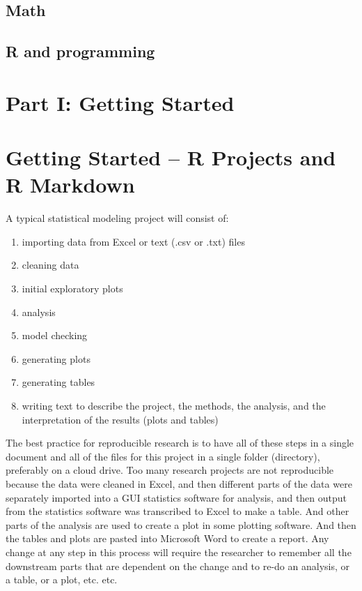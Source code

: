 \documentclass[]{book}
\providecommand{\tightlist}{%
  \setlength{\itemsep}{0pt}\setlength{\parskip}{0pt}}
\begin{document}
\hypertarget{math}{%
\section{Math}\label{math}}

\hypertarget{r-and-programming}{%
\section{R and programming}\label{r-and-programming}}

\hypertarget{part-i-getting-started}{%
\chapter*{Part I: Getting Started}\label{part-i-getting-started}}

\hypertarget{getting-started-r-projects-and-r-markdown}{%
\chapter{Getting Started -- R Projects and R Markdown}\label{getting-started-r-projects-and-r-markdown}}

A typical statistical modeling project will consist of:

\begin{enumerate}
\def\labelenumi{\arabic{enumi}.}
\tightlist
\item
  importing data from Excel or text (.csv or .txt) files
\item
  cleaning data
\item
  initial exploratory plots
\item
  analysis
\item
  model checking
\item
  generating plots
\item
  generating tables
\item
  writing text to describe the project, the methods, the analysis, and the interpretation of the results (plots and tables)
\end{enumerate}

The best practice for reproducible research is to have all of these steps in a single document and all of the files for this project in a single folder (directory), preferably on a cloud drive. Too many research projects are not reproducible because the data were cleaned in Excel, and then different parts of the data were separately imported into a GUI statistics software for analysis, and then output from the statistics software was transcribed to Excel to make a table. And other parts of the analysis are used to create a plot in some plotting software. And then the tables and plots are pasted into Microsoft Word to create a report. Any change at any step in this process will require the researcher to remember all the downstream parts that are dependent on the change and to re-do an analysis, or a table, or a plot, etc. etc.
\end{document}
